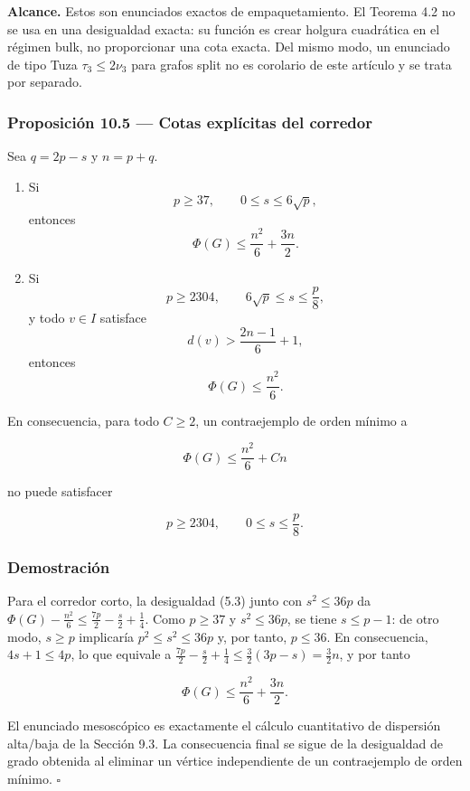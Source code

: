 \documentclass[spanish,11pt,a4paper]{article}
\begin{document}
\textbf{Alcance.} Estos son enunciados exactos de empaquetamiento. El
Teorema 4.2 no se usa en una desigualdad exacta: su función es crear
holgura cuadrática en el régimen bulk, no proporcionar una cota exacta.
Del mismo modo, un enunciado de tipo Tuza \(\tau_3\le2\nu_3\) para
grafos split no es corolario de este artículo y se trata por separado.

\subsubsection{Proposición 10.5 --- Cotas explícitas del
corredor}\label{proposiciuxf3n-10.5-cotas-expluxedcitas-del-corredor}

Sea \(q=2p-s\) y \(n=p+q\).

\begin{enumerate}
\def\labelenumi{\arabic{enumi}.}
\item
  Si \[
  p\ge37,
  \qquad
  0\le s\le6\sqrt p,
  \] entonces \[
  \boxed{
  \Phi(G)\le\frac{n^2}{6}+\frac{3n}{2}
  }.
  \tag{10.2}
  \]
\item
  Si \[
  p\ge2304,
  \qquad
  6\sqrt p\le s\le\frac p8,
  \] y todo \(v\in I\) satisface \[
  d(v)>\frac{2n-1}{6}+1,
  \] entonces \[
  \boxed{
  \Phi(G)\le\frac{n^2}{6}
  }.
  \tag{10.3}
  \]
\end{enumerate}

En consecuencia, para todo \(C\ge2\), un contraejemplo de orden mínimo a

\[
\Phi(G)\le\frac{n^2}{6}+Cn
\]

no puede satisfacer

\[
p\ge2304,
\qquad
0\le s\le\frac p8.
\]

\subsubsection{Demostración}\label{demostraciuxf3n-8}

Para el corredor corto, la desigualdad (5.3) junto con \(s^2\le36p\) da
\(\Phi(G)-\tfrac{n^2}{6}\le\tfrac{7p}{2}-\tfrac{s}{2}+\tfrac14\). Como
\(p\ge37\) y \(s^2\le36p\), se tiene \(s\le p-1\): de otro modo,
\(s\ge p\) implicaría \(p^2\le s^2\le36p\) y, por tanto, \(p\le36\). En
consecuencia, \(4s+1\le4p\), lo que equivale a
\(\tfrac{7p}{2}-\tfrac{s}{2}+\tfrac14\le\tfrac32(3p-s)=\tfrac32n\), y
por tanto

\[
\Phi(G)\le\frac{n^2}{6}+\frac{3n}{2}.
\]

El enunciado mesoscópico es exactamente el cálculo cuantitativo de
dispersión alta/baja de la Sección 9.3. La consecuencia final se sigue
de la desigualdad de grado obtenida al eliminar un vértice independiente
de un contraejemplo de orden mínimo. \(\square\)
\end{document}

